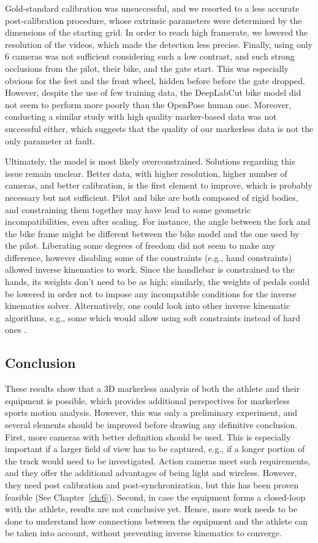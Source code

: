 Gold-standard calibration was unsuccessful, and we resorted to a less accurate post-calibration procedure, whose extrinsic parameters were determined by the dimensions of the starting grid. In order to reach high framerate, we lowered the resolution of the videos, which made the detection less precise. Finally, using only 6 cameras was not sufficient considering such a low contrast, and such strong occlusions from the pilot, their bike, and the gate start. This was especially obvious for the feet and the front wheel, hidden before before the gate dropped. However, despite the use of few training data, the DeepLabCut bike model did not seem to perform more poorly than the OpenPose human one. Moreover, conducting a similar study with high quality marker-based data was not successful either, which suggests that the quality of our markerless data is not the only parameter at fault. 

Ultimately, the model is most likely overconstrained. Solutions regarding this issue remain unclear. Better data, with higher resolution, higher number of cameras, and better calibration, is the first element to improve, which is probably necessary but not sufficient. Pilot and bike are both composed of rigid bodies, and constraining them together may have lead to some geometric incompatibilities, even after scaling. For instance, the angle between the fork and the bike frame might be different between the bike model and the one used by the pilot. Liberating some degrees of freedom did not seem to make any difference, however disabling some of the constraints (e.g., hand constraints) allowed inverse kinematics to work. Since the handlebar is constrained to the hands, its weights don't need to be as high; similarly, the weights of pedals could be lowered in order not to impose any incompatible conditions for the inverse kinematics solver. Alternatively, one could look into other inverse kinematic algorithms, e.g., some which would allow using soft constraints instead of hard ones \cite{Fohanno2014}.


\subsection{Conclusion}
These results show that a 3D markerless analysis of both the athlete and their equipment is possible, which provides additional perspectives for markerless sports motion analysis. However, this was only a preliminary experiment, and several elements should be improved before drawing any definitive conclusion. First, more cameras with better definition should be used. This is especially important if a larger field of view has to be captured, e.g., if a longer portion of the track would need to be investigated. Action cameras meet such requirements, and they offer the additional advantages of being light and wireless. However, they need post calibration and post-synchronization, but this has been proven feasible (See Chapter~\ref{ch:6}). Second, in case the equipment forms a closed-loop with the athlete, results are not conclusive yet. Hence, more work needs to be done to understand how connections between the equipment and the athlete can be taken into account, without preventing inverse kinematics to converge.

